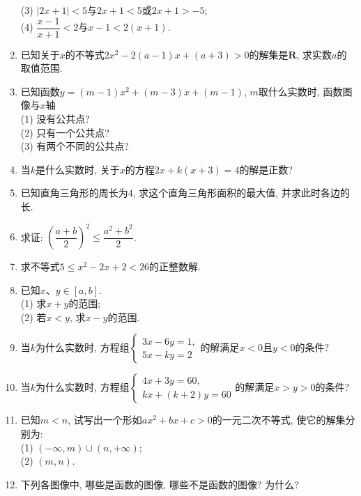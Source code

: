 \documentclass[10pt,a4paper]{article}
\begin{document}
\begin{enumerate}[1.]
(3) $|2x+1|<5$与$2x+1<5$或$2x+1>-5$;\\
(4) $\dfrac{x-1}{x+1}<2$与$x-1<2(x+1)$.
\item 已知关于$x$的不等式$2x^2-2(a-1)x+(a+3)>0$的解集是$\mathbf{R}$, 求实数$a$的取值范围.
\item 已知函数$y=(m-1)x^2+(m-3)x+(m-1)$, $m$取什么实数时, 函数图像与$x$轴\\
(1) 没有公共点?\\
(2) 只有一个公共点?\\
(3) 有两个不同的公共点?
\item 当$k$是什么实数时, 关于$x$的方程$2x+k(x+3)=4$的解是正数?
\item 已知直角三角形的周长为$4$, 求这个直角三角形面积的最大值, 并求此时各边的长.
\item 求证: $(\dfrac{a+b}2)^2\le \dfrac{a^2+b^2}2$.
\item 求不等式$5\le x^2-2x+2<26$的正整数解.
\item 已知$x$、$y\in [a,b]$.\\
(1) 求$x+y$的范围;\\
(2) 若$x<y$, 求$x-y$的范围.
\item 当$k$为什么实数时, 方程组$\begin{cases} 3x-6y=1, \\ 5x-ky=2 \end{cases}$的解满足$x<0$且$y<0$的条件?
\item 当$k$为什么实数时, 方程组$\begin{cases} 4x+3y=60, \\ kx+(k+2)y=60 \end{cases}$的解满足$x>y>0$的条件?
\item 已知$m<n$, 试写出一个形如$ax^2+bx+c>0$的一元二次不等式, 使它的解集分别为:\\
(1) $(-\infty ,m)\cup (n,+\infty)$;\\
(2) $(m,n)$.
\item 下列各图像中, 哪些是函数的图像, 哪些不是函数的图像? 为什么?
\begin{center}
\end{center}
\end{enumerate}
\end{document}
